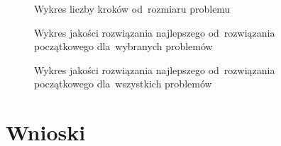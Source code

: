 \documentclass[a4paper,10pt]{article}
\begin{document}
\begin{figure}[h!]
\begin{center}

\caption{Wykres liczby kroków od~rozmiaru problemu}
\label{fig:stepssize}
\end{center}
\end{figure}

\begin{figure}
\begin{center}

\caption{Wykres jakości rozwiązania najlepszego od~rozwiązania początkowego dla~wybranych problemów}
\label{fig:initendquality}
\end{center}
\end{figure}

\begin{figure}[h!]
\begin{center}

\caption{Wykres jakości rozwiązania najlepszego od~rozwiązania początkowego dla~wszystkich problemów}
\label{fig:initendqualityall}
\end{center}
\end{figure}

\section{Wnioski}
\end{document}
